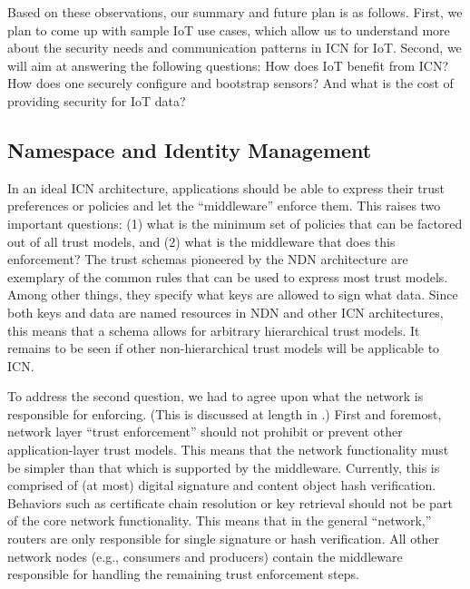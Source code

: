 \documentclass{sig-alternate-10pt}
\begin{document}
Based on these observations, our summary and future plan is as follows. First, we plan to come up with sample IoT use cases, which allow us to understand more about the security needs and communication patterns in ICN for IoT. Second, we will aim at answering the following questions: How does IoT benefit from ICN? How does one securely configure and bootstrap sensors? And what is the cost of providing security for IoT data?

\subsection{Namespace and Identity Management}
In an ideal ICN architecture, applications should be able to express their trust preferences or policies and let the ``middleware'' enforce them. This raises two important questions: (1) what is the minimum set of policies that can be factored out of all trust models, and (2) what is the middleware that does this enforcement? The trust schemas pioneered by the NDN architecture \cite{schemas} are exemplary of the common rules that can be used to express most trust models. Among other things, they specify what keys are allowed to sign what data. Since both keys and data are named resources in NDN and other ICN architectures, this means that a schema allows for arbitrary hierarchical trust models. It remains to be seen if other non-hierarchical trust models will be applicable to ICN.

To address the second question, we had to agree upon what the network is responsible for enforcing. (This is discussed at length in \cite{trust}.)
First and foremost, network layer ``trust enforcement'' should not prohibit or prevent other application-layer trust models. This means that the network functionality must be simpler than that which is supported by the middleware. Currently, this is comprised of (at most) digital signature and content object hash verification. Behaviors such as certificate chain resolution or key retrieval should not be part of the core network functionality. This means that in the general ``network,'' routers are only responsible for single signature or hash verification. All other network nodes (e.g., consumers and producers) contain the middleware responsible for handling the remaining trust enforcement steps.
\end{document}
